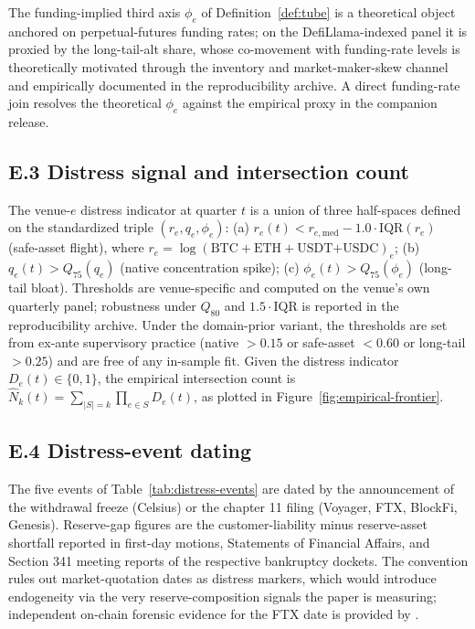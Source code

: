 \documentclass[12pt]{article}
\theoremstyle{sampledef}
\theoremstyle{sampleplain}
\theoremstyle{sampleremark}
\newcommand{\1}{\mathbf{1}}
\begin{document}
The funding-implied third axis $\phi_e$ of
Definition~\ref{def:tube} is a theoretical object anchored on
perpetual-futures funding rates; on the DefiLlama-indexed panel it
is proxied by the long-tail-alt share, whose co-movement with
funding-rate levels is theoretically motivated through the
inventory and market-maker-skew channel and empirically documented
in the reproducibility archive. A direct funding-rate join
resolves the theoretical $\phi_e$ against the empirical proxy in
the companion release.

\subsection*{E.3 Distress signal and intersection count}

The venue-$e$ distress indicator at quarter $t$ is a union of
three half-spaces defined on the standardized triple
$(r_e, q_e, \phi_e)$:
(a) $r_e(t) < r_{e,\mathrm{med}} - 1.0 \cdot \mathrm{IQR}(r_e)$
(safe-asset flight), where
$r_e = \log(\text{BTC} + \text{ETH} + \text{USDT+USDC})_e$;
(b) $q_e(t) > Q_{75}(q_e)$ (native concentration spike);
(c) $\phi_e(t) > Q_{75}(\phi_e)$ (long-tail bloat). Thresholds are
venue-specific and computed on the venue's own quarterly panel;
robustness under $Q_{80}$ and $1.5\cdot$IQR is reported in the
reproducibility archive. Under the domain-prior variant, the
thresholds are set from ex-ante supervisory practice
(native $> 0.15$ or safe-asset $< 0.60$ or long-tail $> 0.25$) and
are free of any in-sample fit. Given the distress indicator
$D_e(t) \in \{0, 1\}$, the empirical intersection count is
$\hat N_k(t) = \sum_{|S|=k} \prod_{e \in S} D_e(t)$,
as plotted in Figure~\ref{fig:empirical-frontier}.

\subsection*{E.4 Distress-event dating}

The five events of Table~\ref{tab:distress-events} are dated by
the announcement of the withdrawal freeze (Celsius) or the
chapter 11 filing (Voyager, FTX, BlockFi, Genesis).
Reserve-gap figures are the customer-liability minus reserve-asset
shortfall reported in first-day motions, Statements of Financial
Affairs, and Section 341 meeting reports of the respective
bankruptcy dockets. The convention rules out market-quotation
dates as distress markers, which would introduce endogeneity via
the very reserve-composition signals the paper is measuring;
independent on-chain forensic evidence for the FTX date is
provided by \citet{Griffin-Kruger2023}.
\end{document}

